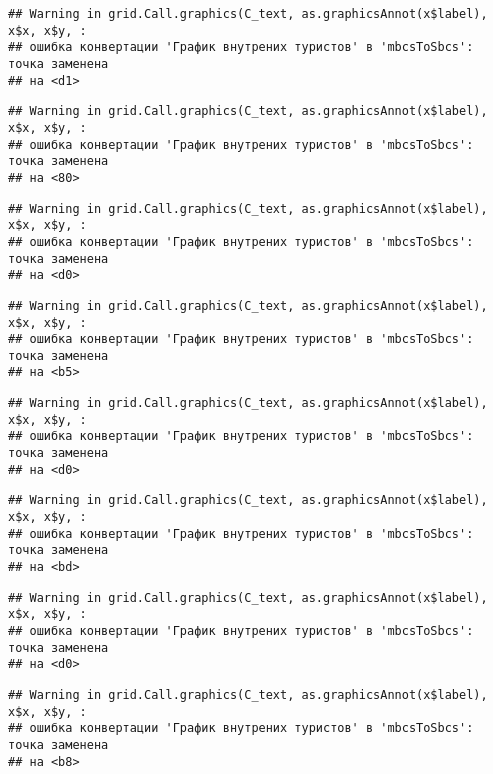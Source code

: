 \documentclass[
]{article}
\begin{document}
\begin{verbatim}
## Warning in grid.Call.graphics(C_text, as.graphicsAnnot(x$label), x$x, x$y, :
## ошибка конвертации 'График внутрених туристов' в 'mbcsToSbcs': точка заменена
## на <d1>
\end{verbatim}

\begin{verbatim}
## Warning in grid.Call.graphics(C_text, as.graphicsAnnot(x$label), x$x, x$y, :
## ошибка конвертации 'График внутрених туристов' в 'mbcsToSbcs': точка заменена
## на <80>
\end{verbatim}

\begin{verbatim}
## Warning in grid.Call.graphics(C_text, as.graphicsAnnot(x$label), x$x, x$y, :
## ошибка конвертации 'График внутрених туристов' в 'mbcsToSbcs': точка заменена
## на <d0>
\end{verbatim}

\begin{verbatim}
## Warning in grid.Call.graphics(C_text, as.graphicsAnnot(x$label), x$x, x$y, :
## ошибка конвертации 'График внутрених туристов' в 'mbcsToSbcs': точка заменена
## на <b5>
\end{verbatim}

\begin{verbatim}
## Warning in grid.Call.graphics(C_text, as.graphicsAnnot(x$label), x$x, x$y, :
## ошибка конвертации 'График внутрених туристов' в 'mbcsToSbcs': точка заменена
## на <d0>
\end{verbatim}

\begin{verbatim}
## Warning in grid.Call.graphics(C_text, as.graphicsAnnot(x$label), x$x, x$y, :
## ошибка конвертации 'График внутрених туристов' в 'mbcsToSbcs': точка заменена
## на <bd>
\end{verbatim}

\begin{verbatim}
## Warning in grid.Call.graphics(C_text, as.graphicsAnnot(x$label), x$x, x$y, :
## ошибка конвертации 'График внутрених туристов' в 'mbcsToSbcs': точка заменена
## на <d0>
\end{verbatim}

\begin{verbatim}
## Warning in grid.Call.graphics(C_text, as.graphicsAnnot(x$label), x$x, x$y, :
## ошибка конвертации 'График внутрених туристов' в 'mbcsToSbcs': точка заменена
## на <b8>
\end{verbatim}
\end{document}
